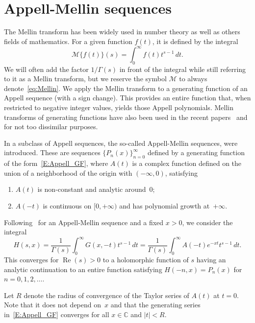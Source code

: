 \documentclass[11pt,a4paper]{amsart}
\newcommand{\C}{\mathbb{C}}
\renewcommand{\Re}{\operatorname{Re}}
\theoremstyle{plain}
\theoremstyle{plain}
\theoremstyle{remark}
\numberwithin{equation}{section}
\begin{document}
\section{Appell-Mellin sequences}
\label{sec:app-mel-seq}

The Mellin transform has been widely used in number theory as well as others fields of mathematics. For a given function $f(t)$, it is defined by the integral
\begin{equation}
\label{eq:Mellin}
  \mathcal{M}\{ f(t) \}(s) = \int_0^{\infty} f(t) t^{s-1}\, dt.
\end{equation}
We will often add the factor $1/\Gamma(s)$ in front of the integral while still referring to it as a Mellin transform, but we reserve the symbol $\mathcal{M}$ to always denote~\eqref{eq:Mellin}.
We apply the Mellin transform to a generating function of an Appell sequence (with a sign change). This provides an entire function that, when restricted to negative integer values, yields those Appell polynomials. Mellin transforms of generating functions have also been used in the recent papers~\cite{CGale-I} and~\cite{CGale-II} for not too dissimilar purposes.

In \cite{NRV} a subclass of Appell sequences, the so-called Appell-Mellin sequences, were introduced. These are sequences $\{P_{n}(x)\}_{n=0}^{\infty}$ defined by a generating function of the form~\eqref{E:Appell_GF}, where $A(t)$ is a complex function defined on the union of a  neighborhood of the origin with $(-\infty,0)$, satisfying
\begin{enumerate}
  \item[\normalfont{(a)}] $A(t)$ is non-constant and analytic around~$0$;
  \item[\normalfont{(b)}] $A(-t)$ is continuous on $[0,+\infty)$ and has polynomial growth at~$+\infty$.
\end{enumerate}

Following~\cite[Theorem~1]{NRV} for an Appell-Mellin sequence and a fixed $x > 0$, we consider the integral 
\begin{equation}
\label{E:Mellin_GF_def}
  H(s,x) = \frac{1}{\Gamma(s)}\int_{0}^{\infty} G(x,-t) t^{s-1}\,dt 
  = \frac{1}{\Gamma(s)} \int_{0}^{\infty} A(-t) e^{-xt} t^{s-1}\,dt.
\end{equation}
This converges for $\Re(s) > 0$ to a holomorphic function of $s$ having an analytic continuation to an entire function satisfying $H(-n,x) = P_n(x)$ for $n=0,1,2,\dots$.

Let $R$ denote the radius of convergence of the Taylor series of $A(t)$ at $t=0$. Note that it does not depend on~$x$ and that the generating series in~\eqref{E:Appell_GF} converges for all $x \in \C$ and $|t| < R$.
\end{document}
